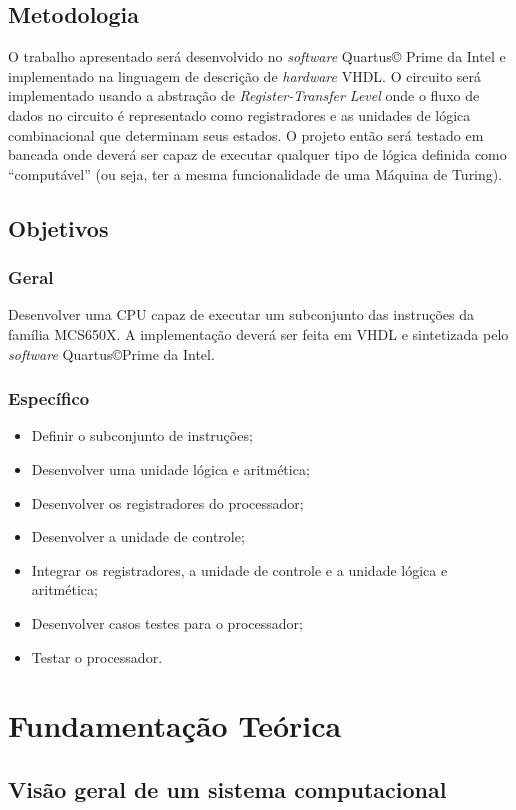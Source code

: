 \documentclass[
	12pt,				  %
	openright,		%
	a4paper,			%
	english,			%
	french,				%
	spanish,			%
	brazil,				%
]{abntex2}
\begin{document}
\section{Metodologia}
O trabalho apresentado será desenvolvido no \emph{software} Quartus\copyright
Prime da Intel e implementado na linguagem de descrição de \emph{hardware} VHDL.
O circuito será implementado usando a abstração de
\emph{Register-Transfer Level} onde o fluxo de dados no circuito é representado
como registradores e as unidades de lógica combinacional que determinam seus
estados. O projeto então será testado em bancada onde deverá ser capaz de
executar qualquer tipo de lógica definida como ``computável'' (ou seja, ter a
mesma funcionalidade de uma Máquina de Turing).


\section{Objetivos}
\subsection*{Geral}
Desenvolver uma CPU capaz de executar um subconjunto das instruções da família
MCS650X. A implementação deverá ser feita em VHDL e sintetizada pelo
\emph{software} Quartus\copyright Prime da Intel.
\subsection*{Específico}
\begin{itemize}
	\item Definir o subconjunto de instruções;
	\item Desenvolver uma unidade lógica e aritmética;
	\item Desenvolver os registradores do processador;
	\item Desenvolver a unidade de controle;
	\item Integrar os registradores, a unidade de controle e a unidade lógica e
	      aritmética;
	\item Desenvolver casos testes para o processador;
	\item Testar o processador.
\end{itemize}

\chapter{Fundamentação Teórica}

\section{Visão geral de um sistema computacional}
\end{document}
